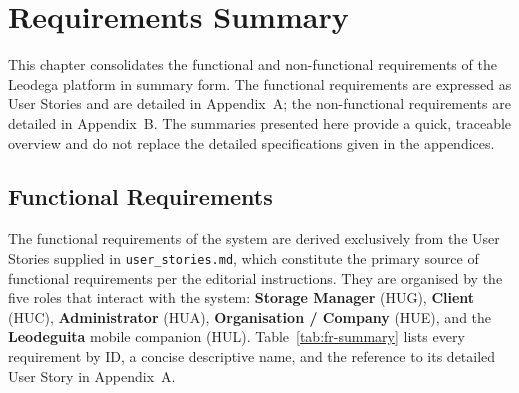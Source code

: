 \documentclass[11pt,a4paper,oneside]{report}
\begin{document}
%
%
\chapter{Requirements Summary}

This chapter consolidates the functional and non-functional requirements of the Leodega platform in summary form. The functional requirements are expressed as User Stories and are detailed in Appendix~A; the non-functional requirements are detailed in Appendix~B. The summaries presented here provide a quick, traceable overview and do not replace the detailed specifications given in the appendices.

\section{Functional Requirements}

The functional requirements of the system are derived exclusively from the User Stories supplied in \texttt{user\_stories.md}, which constitute the primary source of functional requirements per the editorial instructions. They are organised by the five roles that interact with the system: \textbf{Storage Manager} (HUG), \textbf{Client} (HUC), \textbf{Administrator} (HUA), \textbf{Organisation / Company} (HUE), and the \textbf{Leodeguita} mobile companion (HUL). Table~\ref{tab:fr-summary} lists every requirement by ID, a concise descriptive name, and the reference to its detailed User Story in Appendix~A.
\end{document}
